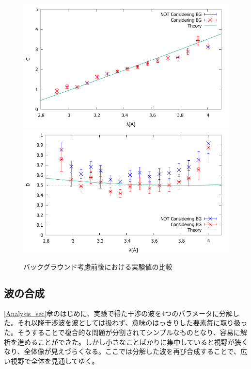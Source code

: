 \begin{figure}[H]
\begin{center}
\ContinuedFloat
\includegraphics[width=12cm]{discussion/ABCD/C_ab_fit.pdf}
\vspace{1cm}
\includegraphics[width=12cm]{discussion/ABCD/D_ab.pdf}
\end{center}
\caption{バックグラウンド考慮前後における実験値の比較}\label{Discussion2_fig_ABCDb}
\end{figure}

\subsection{波の合成}
\ref{Analysis_sec}章のはじめに、実験で得た干渉の波を4つのパラメータに分解した。それ以降干渉波を波としては扱わず、意味のはっきりした要素毎に取り扱った。そうすることで複合的な問題が分割されてシンプルなものとなり、容易に解析を進めることができた。しかし小さなことばかりに集中していると視野が狭くなり、全体像が見えづらくなる。ここでは分解した波を再び合成することで、広い視野で全体を見通してゆく。

